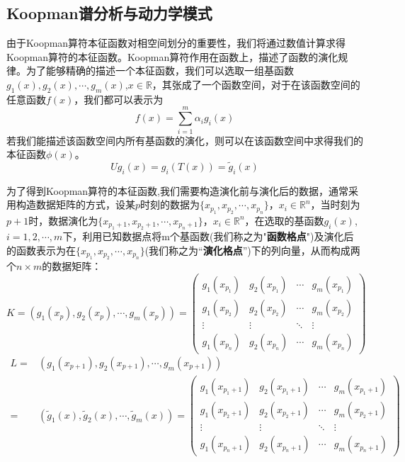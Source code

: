 \subsection{Koopman谱分析与动力学模式}\label{section:Koop_dyna}

由于Koopman算符本征函数对相空间划分的重要性，我们将通过数值计算求得Koopman算符的本征函数。Koopman算符作用在函数上，描述了函数的演化规律。为了能够精确的描述一个本征函数，我们可以选取一组基函数$g_1(x),g_2(x),\cdots,g_m(x)$,$x\in \mathbb{R}$，其张成了一个函数空间，对于在该函数空间的任意函数$f(x)$，我们都可以表示为
\begin{equation}
    f(x)=\sum_{i=1}^m\alpha_ig_i(x)
\end{equation}
若我们能描述该函数空间内所有基函数的演化，则可以在该函数空间中求得我们的本征函数$\phi(x)$。
\begin{equation}
    Ug_i(x)=g_i(T(x))=\tilde{g}_i(x)
\end{equation}

为了得到Koopman算符的本征函数,我们需要构造演化前与演化后的数据，通常采用构造数据矩阵的方式，设某$p$时刻的数据为$\{x_{p_1},x_{p_2},\cdots,x_{p_n}\}$，$x_i\in \mathbb{R}^n$，当时刻为$p+1$时，数据演化为$\{x_{p_1+1},x_{p_2+1},\cdots,x_{p_n+1}\}$，$x_i\in \mathbb{R}^n$，在选取的基函数${g_i(x)}$,$i=1,2,\cdots,m$下，利用已知数据点将m个基函数(我们称之为"\textbf{函数格点}")及演化后的函数表示为在$\{x_{p_1},x_{p_2},\cdots,x_{p_n}\}$(我们称之为“\textbf{演化格点}”)下的列向量，从而构成两个$n\times m$的数据矩阵：
\begin{equation}
        K=(g_1(x_p),g_2(x_p),\cdots,g_m(x_p))=
        \begin{pmatrix}
        g_1(x_{p_1}) & g_2(x_{p_1}) & \cdots & g_m(x_{p_1}) \\
        g_1(x_{p_2}) & g_2(x_{p_2}) & \cdots & g_m(x_{p_2}) \\
        \vdots       & \vdots       & \ddots & \vdots \\
        g_1(x_{p_n}) & g_2(x_{p_n}) & \cdots & g_m(x_{p_n})
        \end{pmatrix}
\end{equation}
\begin{equation}
    \begin{aligned}
    L=&(g_1(x_{p+1}),g_2(x_{p+1}),\cdots,g_m(x_{p+1}))\\
    =&(\tilde{g}_1(x),\tilde{g}_2(x),\cdots,\tilde{g}_m(x))=
        \begin{pmatrix}
        g_1(x_{p_1+1}) & g_2(x_{p_1+1}) & \cdots & g_m(x_{p_1+1}) \\
        g_1(x_{p_2+1}) & g_2(x_{p_2+1}) & \cdots & g_m(x_{p_2+1}) \\
        \vdots         & \vdots         & \ddots & \vdots \\
        g_1(x_{p_n+1}) & g_2(x_{p_n+1}) & \cdots & g_m(x_{p_n+1})
        \end{pmatrix}
    \end{aligned}
\end{equation}

